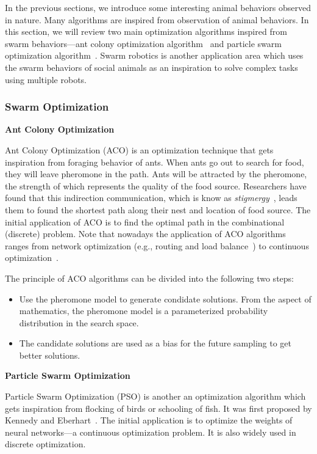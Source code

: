In the previous sections, we introduce some interesting animal behaviors observed in nature. Many algorithms are inspired from observation of animal behaviors. In this section, we will review two main optimization algorithms inspired from swarm behaviors---ant colony optimization algorithm~\cite{Dorigo_1997} and particle swarm optimization algorithm~\cite{Kennedy:ICNN:1995}. Swarm robotics is another application area which uses the swarm behaviors of social animals as an inspiration to solve complex tasks using multiple robots. 

\subsubsection{Swarm Optimization}

\textbf{Ant Colony Optimization}

Ant Colony Optimization (ACO) is an optimization technique that gets inspiration from foraging behavior of ants. When ants go out to search for food, they will leave pheromone in the path. Ants will be attracted by the pheromone, the strength of which represents the quality of the food source. Researchers have found that this indirection communication, which is know as \textit{stigmergy}~\cite{Holland:AL:1999}, leads them to found the shortest path along their nest and location of food source. The initial application of ACO is to find the optimal path in the combinational (discrete) problem. Note that nowadays the application of ACO algorithms ranges from network optimization (e.g., routing and load balance~\cite{DiCaro:JAIR:1998}) to continuous optimization~\cite{Dorigo:LNCS:2004}.   

The principle of ACO algorithms can be divided into the following two steps:

\begin{itemize}
\item Use the pheromone model to generate condidate solutions. From the aspect of mathematics, the pheromone model is a parameterized probability distribution in the search space.

\item The candidate solutions are used as a bias for the future sampling to get better solutions.
\end{itemize}

\textbf{Particle Swarm Optimization}

Particle Swarm Optimization (PSO) is another an optimization algorithm which gets inspiration from flocking of birds or schooling of fish. It was first proposed by Kennedy and Eberhart~\cite{Kennedy:ICNN:1995}. The initial application is to optimize the weights of neural networks---a continuous optimization problem. It is also widely used in discrete optimization. 

